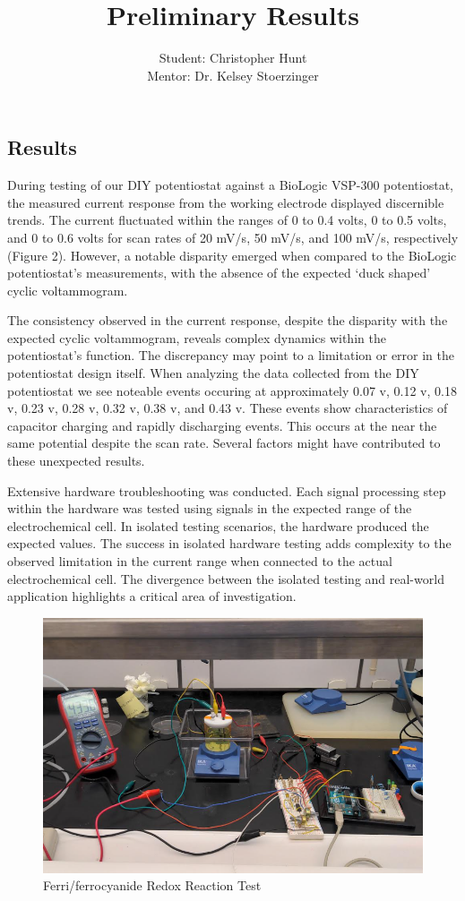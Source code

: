 \documentclass{article}
\title{\textcolor{mycolor}{\textbf{{\huge Preliminary Results}}}}
\author{Student: Christopher Hunt \\ Mentor: Dr. Kelsey Stoerzinger}
\date{}
\begin{document}
\pagestyle{fancy}
\fancyhf{}
\rfoot{}
\rhead{\thepage}
\maketitle


\subsection*{Results}

During testing of our DIY potentiostat against a BioLogic VSP-300 potentiostat, the measured current response from the working electrode displayed discernible trends. The current fluctuated within the ranges of 0 to 0.4 volts, 0 to 0.5 volts, and 0 to 0.6 volts for scan rates of 20 mV/s, 50 mV/s, and 100 mV/s, respectively (Figure 2). However, a notable disparity emerged when compared to the BioLogic potentiostat's measurements, with the absence of the expected `duck shaped' cyclic voltammogram.

    
The consistency observed in the current response, despite the disparity with the expected cyclic voltammogram, reveals complex dynamics within the potentiostat's function. The discrepancy may point to a limitation or error in the potentiostat design itself. When analyzing the data collected from the DIY potentiostat we see noteable events occuring at approximately 0.07 v, 0.12 v, 0.18 v, 0.23 v, 0.28 v, 0.32 v, 0.38 v, and 0.43 v. These events show characteristics of capacitor charging and rapidly discharging events. This occurs at the near the same potential despite the scan rate. Several factors might have contributed to these unexpected results.

Extensive hardware troubleshooting was conducted. Each signal processing step within the hardware was tested using signals in the expected range of the electrochemical cell. In isolated testing scenarios, the hardware produced the expected values. The success in isolated hardware testing adds complexity to the observed limitation in the current range when connected to the actual electrochemical cell. The divergence between the isolated testing and real-world application highlights a critical area of investigation.

\begin{figure}[H]
  \centering
  \includegraphics[width=.5\linewidth]{lab_test.png}
  \caption{Ferri/ferrocyanide Redox Reaction Test}
  \end{figure}
  
\end{document}
